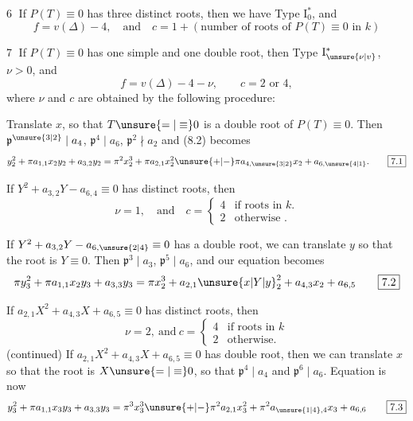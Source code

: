 \reversemarginpar
{}\textcircled{6} If $P(T)\equiv0$ has three distinct roots, then we have Type $\mathrm I_0^{*}$, and
\[
 f=v(\Delta)-4,\quad\text{and}\quad c=1+(\text{number of roots of }P(T)\equiv0\text{ in }k)
\]

\textcircled{7} If $P(T)\equiv0$ has one simple and one double root, then Type $\mathrm I_{\unsure{\nu|v}}^{*}$, $\nu>0$, and
\[
 f=v(\Delta)-4-\nu,\qquad c=2\text{ or }4,
\]
where $\nu$ and $c$ are obtained by the following procedure:

%
Translate $x$, so that $T\unsure{=|\equiv}0$ is a double root of $P(T)\equiv0$. Then $\mathfrak p^{\unsure{3|2}}\mid a_4$, $\mathfrak p^4\mid a_6$, $\mathfrak p^2\nmid a_2$ and (8.2) becomes
\[
 y_2^2+\pi a_{1,1}x_2y_2+a_{3,2}y_2
 =\pi^2x_2^3+\pi a_{2,1}x_2^2\unsure{+|-}\pi a_{4,\unsure{3|2}}x_2+a_{6,\unsure{4|1}}.
 \tag*{\fbox{7.1}}
\]

If $Y^2+a_{3,2}Y-a_{6,4}\equiv0$ has distinct roots, then
\[
 \nu=1,\quad\text{and}\quad c=\begin{cases}4&\text{if roots in }k.\\2&\text{otherwise }.\end{cases}
\]

If $Y^2+a_{3,2}Y-a_{6,\unsure{2|4}}\equiv0$ has a double root, we can translate $y$ so that the root is $Y\equiv0$. Then $\mathfrak p^3\mid a_3$, $\mathfrak p^5\mid a_6$, and our equation becomes
\[
 \pi y_3^2+\pi a_{1,1}x_2y_3+a_{3,3}y_3
 =\pi x_2^3+a_{2,1}{\unsure{x|Y|y}}_2^2+a_{4,3}x_2+a_{6,5}
 \tag*{\fbox{7.2}}
\]

If $a_{2,1}X^2+a_{4,3}X+a_{6,5}\equiv0$ has distinct roots, then
\[
 \nu=2,\ \text{and}\ c=\begin{cases}4&\text{if roots in }k\\2&\text{otherwise}.\end{cases}
\]
\normalmarginpar
\hfill(continued)
\clearpage
{}
\reversemarginpar
%
If $a_{2,1}X^2+a_{4,3}X+a_{6,5}\equiv0$ has double root, then we can translate $x$ so that the root is $X\unsure{=|\equiv}0$, so that $\mathfrak p^4\mid a_4$ and $\mathfrak p^6\mid a_6$. Equation is now
\[
 y_3^2+\pi a_{1,1}x_3y_3+a_{3,3}y_3
 =\pi^3x_3^3\unsure{+|-}\pi^2a_{2,1}x_3^2+\pi^2a_{\unsure{1|4},4}x_3+a_{6,6}
 \tag*{\fbox{7.3}}
\]

